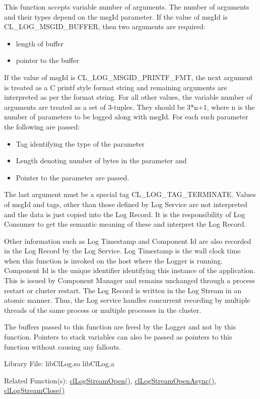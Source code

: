 \begin{flushleft}
\begin{Desc}
This function accepts variable number of arguments. The number of arguments and their types depend on the msgId parameter. If the value of msgId is 
CL\_\-LOG\_\-MSGID\_\-BUFFER, then two arguments are required:
\begin{itemize}
\item
length of buffer 
\item
pointer to the buffer
\end{itemize}
If the value of msgId is CL\_\-LOG\_\-MSGID\_\-PRINTF\_\-FMT, the next argument is treated as a C printf style format string and remaining arguments are 
interpreted as per the format string. For all other values, the variable number of arguments are treated as a set of 3-tuples. They should be 3*n+1,
where n is the number of parameters to be logged along with msgId. For each such parameter the following are passed:
\begin{itemize}
\item
Tag identifying the type of the parameter
\item
Length denoting number of bytes in the parameter and 
\item
Pointer to the parameter are passed. 
\end{itemize}
The last argument must be a special tag CL\_\-LOG\_\-TAG\_\-TERMINATE. Values of msgId and tags, 
other than those defined by Log Service are not interpreted and the data is just copied into the Log Record. It is the responsibility of Log Consumer 
to get the semantic meaning of these and interpret the Log Record.
\par
Other information such as Log Timestamp and Component Id are also recorded in the Log Record by the Log Service. Log Timestamp is the wall clock 
time when this function is invoked on the host where the Logger is running. Component Id is the unique identifier identifying this 
instance of the application. This is issued by Component Manager and remains unchanged through a process restart or cluster restart.
The Log Record is written in the Log Stream in an atomic manner. Thus, the Log service handles concurrent recording by multiple threads of the
same process or multiple processes in the cluster.
\par
The buffers passed to this function are freed by the Logger and not by this function.
Pointers to stack variables can also be passed as pointers to this function without causing any fallouts.

\end{Desc}
\begin{Desc}
\item[Library File:] libClLog.so\newline
libClLog.a\end{Desc}
\begin{Desc}
\item[Related Function(s):]\hyperlink{pagelog106}{clLogStreamOpen()}, \hyperlink{pagelog106}{clLogStreamOpenAsync()},
\hyperlink{pagelog108}{clLogStreamClose()}\end{Desc}
\newpage	







\end{flushleft}
